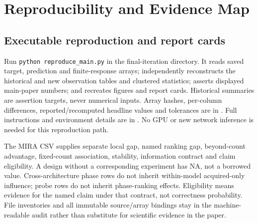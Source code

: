 \section{Reproducibility and Evidence Map}
\subsection{Executable reproduction and report cards}
Run \texttt{python reproduce\_main.py} in the final-iteration directory. It reads saved target, prediction and finite-response arrays; independently reconstructs the historical and new observation tables and clustered statistics; asserts displayed main-paper numbers; and recreates figures and report cards. Historical summaries are assertion targets, never numerical inputs. Array hashes, per-column differences, reported/recomputed headline values and tolerances are in . Full instructions and environment details are in . No GPU or new network inference is needed for this reproduction path.

The MIRA CSV supplies separate local gap, named ranking gap, beyond-count advantage, fixed-count association, stability, information contract and claim eligibility. A design without a corresponding experiment has NA, not a borrowed value. Cross-architecture phase rows do not inherit within-model acquired-only influence; probe rows do not inherit phase-ranking effects. Eligibility means evidence for the named claim under that contract, not correctness probability. File inventories and all immutable source/array bindings stay in the machine-readable audit rather than substitute for scientific evidence in the paper.

